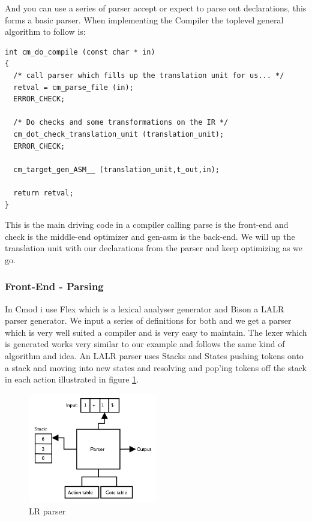 \documentclass[defaultstyle,11pt]{article}
\begin{document}
And you can use a series of parser accept or expect to parse out declarations, this forms a basic parser. When
implementing the Compiler the toplevel general algorithm to follow is:

\begin{lstlisting}
int cm_do_compile (const char * in)
{
  /* call parser which fills up the translation unit for us... */
  retval = cm_parse_file (in);
  ERROR_CHECK;

  /* Do checks and some transformations on the IR */
  cm_dot_check_translation_unit (translation_unit);
  ERROR_CHECK;

  cm_target_gen_ASM__ (translation_unit,t_out,in);

  return retval;
}
\end{lstlisting}

This is the main driving code in a compiler calling parse is the front-end and check is the middle-end optimizer and gen-asm
is the back-end. We will up the translation unit with our declarations from the parser and keep optimizing as we go.

\subsubsection{Front-End - Parsing}
In Cmod i use Flex which is a lexical analyser generator and Bison a LALR parser generator. We input a series of definitions
for both and we get a parser which is very well suited a compiler and is very easy to maintain. The lexer which is generated
works very similar to our example and follows the same kind of algorithm and idea. An LALR parser uses Stacks and States
pushing tokens onto a stack and moving into new states and resolving and pop'ing tokens off the stack in each action illustrated
in figure \ref{fig:LR parser}.

\begin{figure}[h!]
  \caption{LR parser}
  \label{fig:LR parser}
  \centering
    \includegraphics[width=0.5\textwidth]{LR_Parser.png}
\end{figure}
\end{document}
